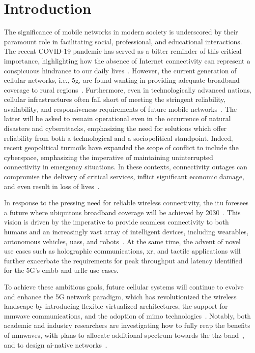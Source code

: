 \glsresetall
\chapter{Introduction}
\label{ch:intro}

The significance of mobile networks in modern society is underscored by their paramount role in facilitating social, professional, and educational interactions. The recent COVID-19 pandemic has served as a bitter reminder of this critical importance, highlighting how the absence of Internet connectivity can represent a conspicuous hindrance to our daily lives~\cite{feldmann2021year}.
However, the current generation of cellular networks, i.e., \gls{5g}, are found wanting in providing adequate broadband coverage to rural regions~\cite{yaacoub2020key}. Furthermore, even in technologically advanced nations, cellular infrastructures often fall short of meeting the stringent reliability, availability, and responsiveness requirements of future mobile networks~\cite{giordani2020non}. The latter will be asked to remain operational even in the occurrence of natural disasters and cyberattacks, emphasizing the need for solutions which offer reliability from both a technological and a sociopolitical standpoint.
Indeed, recent geopolitical turmoils have expanded the scope of conflict to include the cyberspace, emphasizing the imperative of maintaining uninterrupted connectivity in emergency situations. In these contexts, connectivity outages can compromise the delivery of critical services, inflict significant economic damage, and even result in loss of lives~\cite{internet_ukr_afg}.

In response to the pressing need for reliable wireless connectivity, the \gls{itu} foresees a future where ubiquitous broadband coverage will be achieved by 2030~\cite{imt2030}. This vision is driven by the imperative to provide seamless connectivity to both humans and an increasingly vast array of intelligent devices, including wearables, autonomous vehicles, \glspl{uas}, and robots~\cite{mozaffari2018beyond}.
At the same time, the advent of novel use cases such as holographic communications, \gls{xr}, and tactile applications will further exacerbate the requirements for peak throughput and latency identified for the 5G's \gls{embb} and \gls{urllc} use cases. 

To achieve these ambitious goals, future cellular systems will continue to evolve and enhance the 5G network paradigm, which has revolutionized the wireless landscape by introducing flexible virtualized architectures, the support for \gls{mmwave} communications, and the adoption of \gls{mimo} technologies~\cite{ghosh20195g}. 
Notably, both academic and industry researchers are investigating how to fully reap the benefits of \glspl{mmwave}, with plans to allocate additional spectrum towards the \gls{thz} band~\cite{9887921}, and to design \gls{ai}-native networks~\cite{letaief2019roadmap}.

